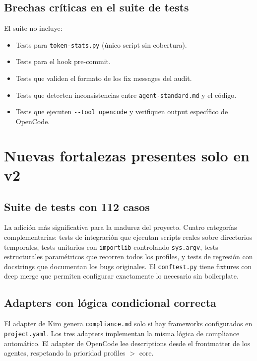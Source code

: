 \documentclass[12pt,a4paper]{article}
\begin{document}
\subsection{Brechas cr\'iticas en el suite de tests}

El suite no incluye:
\begin{itemize}
  \item Tests para \texttt{token-stats.py} (\'unico script sin cobertura).
  \item Tests para el hook pre-commit.
  \item Tests que validen el formato de los fix messages del audit.
  \item Tests que detecten inconsistencias entre \texttt{agent-standard.md} y el
    c\'odigo.
  \item Tests que ejecuten \texttt{-{}-tool opencode} y verifiquen output
    espec\'ifico de OpenCode.
\end{itemize}

\section{Nuevas fortalezas presentes solo en v2}

\subsection{Suite de tests con 112 casos}

La adici\'on m\'as significativa para la madurez del proyecto. Cuatro categor\'ias
complementarias: tests de integraci\'on que ejecutan scripts reales sobre
directorios temporales, tests unitarios con \texttt{importlib} controlando
\texttt{sys.argv}, tests estructurales param\'etricos que recorren todos los
profiles, y tests de regresi\'on con docstrings que documentan los bugs
originales. El \texttt{conftest.py} tiene fixtures con deep merge que permiten
configurar exactamente lo necesario sin boilerplate.

\subsection{Adapters con l\'ogica condicional correcta}

El adapter de Kiro genera \texttt{compliance.md} solo si hay frameworks
configurados en \texttt{project.yaml}. Los tres adapters implementan la misma
l\'ogica de compliance autom\'atico. El adapter de OpenCode lee descriptions desde
el frontmatter de los agentes, respetando la prioridad profiles $>$ core.
\end{document}
